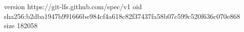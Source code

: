version https://git-lfs.github.com/spec/v1
oid sha256:b2dba1947b991666be984cf4a618c82f37437fa58b07c599c520f636c070e868
size 182058
